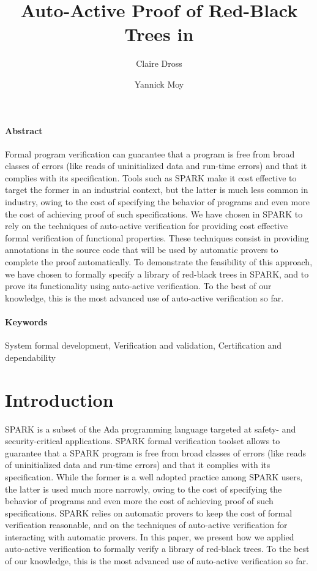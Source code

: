 \documentclass{llncs}
\title{Auto-Active Proof of Red-Black Trees in \spark}
\author{Claire Dross \and Yannick Moy}
\institute{AdaCore, F-75009 Paris}
\date{}
\newcommand{\spark}{SPARK\xspace}
\begin{document}
\sloppy
{}
\maketitle

\paragraph{Abstract}
Formal program verification can guarantee that a program is free from broad
classes of errors (like reads of uninitialized data and run-time errors) and
that it complies with its specification. Tools such as \spark make it cost
effective to target the former in an industrial context, but the latter is much
less common in industry, owing to the cost of specifying the behavior of
programs and even more the cost of achieving proof of such specifications. We
have chosen in \spark to rely on the techniques of auto-active verification for
providing cost effective formal verification of functional properties. These
techniques consist in providing annotations in the source code that will be
used by automatic provers to complete the proof automatically. To demonstrate
the feasibility of this approach, we have chosen to formally specify a library
of red-black trees in \spark, and to prove its functionality using auto-active
verification. To the best of our knowledge, this is the most advanced use of
auto-active verification so far.

\paragraph{Keywords}
System formal development, Verification and validation,
Certification and dependability

\section{Introduction}

\spark is a subset of the Ada programming language targeted at safety- and
security-critical applications. \spark formal verification toolset allows to
guarantee that a \spark program is free from broad classes of errors (like reads
of uninitialized data and run-time errors) and that it complies with its
specification. While the former is a well adopted practice among \spark users,
the latter is used much more narrowly, owing to the cost of specifying the
behavior of programs and even more the cost of achieving proof of such
specifications. \spark relies on automatic provers to keep the cost of formal
verification reasonable, and on the techniques of auto-active verification for
interacting with automatic provers. In this paper, we present how we applied
auto-active verification to formally verify a library of red-black trees. To
the best of our knowledge, this is the most advanced use of auto-active
verification so far.
\end{document}
